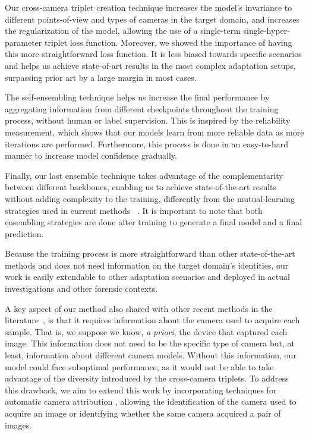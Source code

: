 \documentclass[journal]{IEEEtran}
\begin{document}
Our cross-camera triplet creation technique increases the model's invariance to different points-of-view and types of cameras in the target domain, and increases the regularization of the model, allowing the use of a single-term single-hyper-parameter triplet loss function. Moreover, we showed the importance of having this more straightforward loss function. It is less biased towards specific scenarios and helps us achieve state-of-art results in the most complex adaptation setups, surpassing prior art by a large margin in most cases. 

The self-ensembling technique helps us increase the final performance by aggregating information from different checkpoints throughout the training process, without human or label supervision. This is inspired by the reliability measurement, which shows that our models learn from more reliable data as more iterations are performed. Furthermore, this process is done in an easy-to-hard manner to increase model confidence gradually.

Finally, our last ensemble technique takes advantage of the complementarity between different backbones, enabling us to achieve state-of-the-art results without adding complexity to the training, differently from the mutual-learning strategies used in current methods ~\cite{zhai2020multiple, yin2020sskd, chen2020enhancing}. It is important to note that both ensembling strategies are done after training to generate a final model and a final prediction.

Because the training process is more straightforward than other state-of-the-art methods and does not need information on the target domain's identities, our work is easily extendable to other adaptation scenarios and deployed in actual investigations and other forensic contexts.

A key aspect of our method also shared with other recent methods in the literature~\cite{wu2019unsupervised, zhai2020ad, zhong2020learning}, is that it requires information about the camera used to acquire each sample. That is, we suppose we know, \textit{a priori}, the device that captured each image. This information does not need to be the specific type of camera but, at least, information about different camera models. Without this information, our model could face suboptimal performance, as it would not be able to take advantage of the diversity introduced by the cross-camera triplets. To address this drawback, we aim to extend this work by incorporating techniques for automatic camera attribution \cite{costa2014open, bernacki2020survey}, allowing the identification of the camera used to acquire an image or identifying whether the same camera acquired a pair of images.
\end{document}
